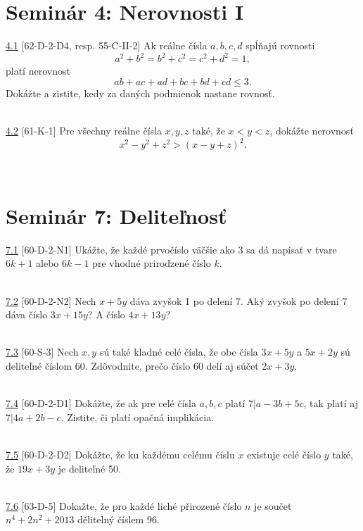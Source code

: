 \section*{Seminár 4: Nerovnosti I}

\noindent \ul{4.1} [62-D-2-D4, resp. 55-C-II-2] Ak reálne čísla $a, b, c, d$ spĺňajú rovnosti $$a^2+ b^2= b^2+ c^2= c^2+ d^2= 1,$$
platí nerovnost
$$ab + ac + ad + bc + bd + cd \leq 3.$$
Dokážte a zistite, kedy za daných podmienok nastane rovnosť.


\\

\noindent \ul{4.2} [61-K-1]
Pre všechny reálne čísla $x, y, z$ také, že $x < y < z$, dokážte nerovnosť $$x^2 - y^2
+ z^2> (x - y + z)^2.$$


\\

\section*{Seminár 7: Deliteľnosť}

\noindent \ul{7.1} [60-D-2-N1] Ukážte, že každé prvočíslo väčšie ako 3 sa dá napísať v tvare $6k + 1$ alebo $6k - 1$ pre vhodné prirodzené číslo $k$.


\\

\noindent \ul{7.2} [60-D-2-N2] Nech $x + 5y$ dáva zvyšok 1 po delení 7. Aký zvyšok po delení 7 dáva číslo $3x + 15y$? A číslo $4x + 13y$?


\\

\noindent \ul{7.3} [60-S-3] Nech $x, y$ sú také kladné celé čísla, že obe čísla $3x + 5y$ a $5x + 2y$ sú deliteľné číslom 60. Zdôvodnite, prečo číslo 60 delí aj súčet $2x + 3y$.


\\

\noindent \ul{7.4} [60-D-2-D1] Dokážte, že ak pre celé čísla $a, b, c$ platí $7 | a - 3b + 5c$, tak platí aj $7 | 4a + 2b - c$. Zistite, či platí opačná implikácia.


\\

\noindent \ul{7.5} [60-D-2-D2] Dokážte, že ku každému celému číslu $x$ existuje celé číslo $y$ také, že $19x+3y$ je deliteľné 50.


\\

\noindent \ul{7.6} [63-D-5] Dokažte, že pro každé liché přirozené číslo $n$ je
součet $n^4 + 2n^2 + 2 013$ dělitelný číslem 96.

